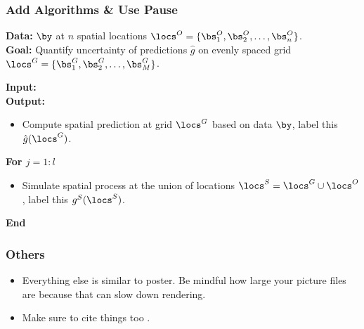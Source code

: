 \documentclass[serif,12pt, aspectratio=169]{beamer}
\begin{document}
\begin{frame}
	\frametitle{Add Algorithms \& Use Pause}
\textbf{Data:} $\by$ at $n$ spatial locations $\locs^O = \{\bs^O_1, \bs^O_2, \dots, \bs^O_n\}$.   \\
	\textbf{Goal:} Quantify uncertainty of predictions $\hat{g}$ on evenly spaced grid $\locs^G = \{\bs^G_1, \bs_2^G, \dots, \bs_M^G\}$. \pause
	\begin{algorithm}[H] 
	\caption*{\textbf{Algorithm 1} Conditional Simulation Method}
	{ \small \textbf{Input: }  }\\
	{ \small \textbf{Output: }  } \pause
		\begin{itemize}
		\item { \small Compute spatial prediction at grid $\locs^G$ based on data $\by$, label this $\hat{g}(\locs^G)$.} \pause
		\end{itemize}
		{ \small \noindent \textbf{For $j = 1:l$}}
		\begin{itemize}
		\item { \small Simulate spatial process at the union of locations $\locs^S = \locs^G \cup \locs^O$, label this $g^S(\locs^S)$.}
		\end{itemize}
		{ \small \noindent \textbf{End}}
		\vspace{1pt}
	\end{algorithm}
\end{frame}

\begin{frame}
	\frametitle{Others}
	\begin{itemize}
		\item Everything else is similar to poster. Be mindful how large your picture files are because that can slow down rendering. 
		\item Make sure to cite things too \cite{PlaceHolderSource}.
	\end{itemize}
	
	
	
\end{frame}
\end{document}
